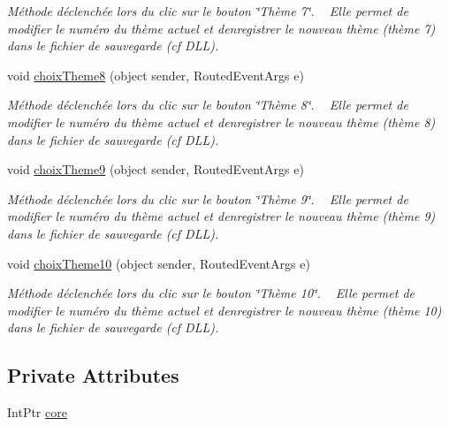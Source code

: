 \begin{DoxyCompactItemize}
\begin{DoxyCompactList}\small\item\em Méthode déclenchée lors du clic sur le bouton \char`\"{}\+Thème 7\char`\"{}. ~\newline
Elle permet de modifier le numéro du thème actuel et d\textquotesingle{}enregistrer le nouveau thème (thème 7) dans le fichier de sauvegarde (cf D\+LL). \end{DoxyCompactList}\item 
void \hyperlink{class_my_domotik_1_1_reglages_couleur_acc8582c74ff2a819799e9dd43325571e}{choix\+Theme8} (object sender, Routed\+Event\+Args e)
\begin{DoxyCompactList}\small\item\em Méthode déclenchée lors du clic sur le bouton \char`\"{}\+Thème 8\char`\"{}. ~\newline
Elle permet de modifier le numéro du thème actuel et d\textquotesingle{}enregistrer le nouveau thème (thème 8) dans le fichier de sauvegarde (cf D\+LL). \end{DoxyCompactList}\item 
void \hyperlink{class_my_domotik_1_1_reglages_couleur_a0deb31b4ca5c2ec1571ba599203ad147}{choix\+Theme9} (object sender, Routed\+Event\+Args e)
\begin{DoxyCompactList}\small\item\em Méthode déclenchée lors du clic sur le bouton \char`\"{}\+Thème 9\char`\"{}. ~\newline
Elle permet de modifier le numéro du thème actuel et d\textquotesingle{}enregistrer le nouveau thème (thème 9) dans le fichier de sauvegarde (cf D\+LL). \end{DoxyCompactList}\item 
void \hyperlink{class_my_domotik_1_1_reglages_couleur_a4cc8ea4b81112546043bedd9689193e3}{choix\+Theme10} (object sender, Routed\+Event\+Args e)
\begin{DoxyCompactList}\small\item\em Méthode déclenchée lors du clic sur le bouton \char`\"{}\+Thème 10\char`\"{}. ~\newline
Elle permet de modifier le numéro du thème actuel et d\textquotesingle{}enregistrer le nouveau thème (thème 10) dans le fichier de sauvegarde (cf D\+LL). \end{DoxyCompactList}\end{DoxyCompactItemize}
\subsection*{Private Attributes}
\begin{DoxyCompactItemize}
\item 
Int\+Ptr \hyperlink{class_my_domotik_1_1_reglages_couleur_a897c7d11c6ad4a5a93a2b4383486d0db}{core}
\end{DoxyCompactItemize}


